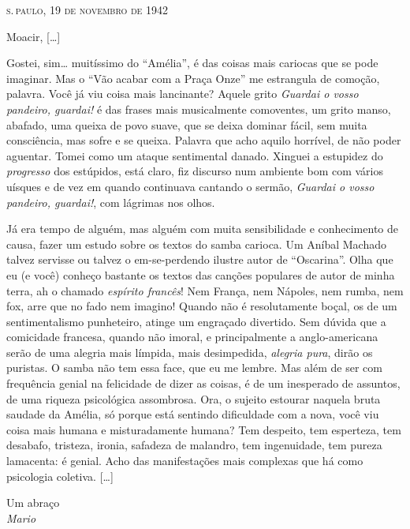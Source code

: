 \begin{flushright}
\textsc{s.\,paulo, 19 de novembro de 1942}
\end{flushright}

\noindent Moacir, {[}\ldots{}{]}

\noindent Gostei, sim\ldots{} muitíssimo do ``Amélia'', é das coisas mais cariocas
que se pode imaginar. Mas o ``Vão acabar com a Praça Onze'' me estrangula de
comoção, palavra. Você já viu coisa mais lancinante? Aquele grito
\textit{Guardai o vosso pandeiro, guardai!} é das frases mais musicalmente
comoventes, um grito manso, abafado, uma queixa de povo suave, que se
deixa dominar fácil, sem muita consciência, mas sofre e se queixa.
Palavra que acho aquilo horrível, de não poder aguentar. Tomei como um
ataque sentimental danado. Xinguei a estupidez do \textit{progresso} dos
estúpidos, está claro, fiz discurso num ambiente bom com vários uísques
e de vez em quando continuava cantando o sermão, \textit{Guardai o vosso
pandeiro, guardai!}, com lágrimas nos olhos.

Já era tempo de alguém, mas alguém com muita sensibilidade e
conhecimento de causa, fazer um estudo sobre os textos do samba carioca.
Um Aníbal Machado talvez servisse ou talvez o em-se-perdendo ilustre
autor de ``Oscarina''. Olha que eu (e você) conheço bastante os
textos das canções populares de autor de minha terra, ah o chamado
\textit{espírito francês}! Nem França, nem Nápoles, nem rumba, nem fox, arre
que no fado nem imagino! Quando não é resolutamente boçal, os de um
sentimentalismo punheteiro, atinge um engraçado divertido. Sem dúvida
que a comicidade francesa, quando não imoral, e principalmente a
anglo-americana serão de uma alegria mais límpida, mais desimpedida,
\textit{alegria pura}, dirão os puristas. O samba não tem essa face, que eu me
lembre. Mas além de ser com frequência genial na felicidade de dizer as
coisas, é de um inesperado de assuntos, de uma riqueza psicológica
assombrosa. Ora, o sujeito estourar naquela bruta saudade da Amélia, só
porque está sentindo dificuldade com a nova, você viu coisa mais humana
e misturadamente humana? Tem despeito, tem esperteza, tem desabafo,
tristeza, ironia, safadeza de malandro, tem ingenuidade, tem pureza
lamacenta: é genial. Acho das manifestações mais complexas que há como
psicologia coletiva. {[}\ldots{}{]}

\begin{flushright}
Um abraço\\
\textit{Mario}
\end{flushright}


